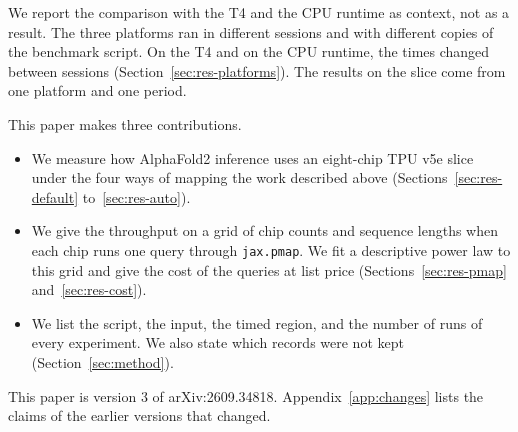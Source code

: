 We report the comparison with the T4 and the CPU runtime as context, not as a result. The three platforms ran in
different sessions and with different copies of the benchmark script. On the T4 and on the CPU runtime, the times
changed between sessions (Section~\ref{sec:res-platforms}). The results on the slice come from one platform and one period.

\keepwithlist
This paper makes three contributions.
\begin{itemize}
\item We measure how AlphaFold2 inference uses an eight-chip TPU v5e slice under the four ways of mapping the work
described above (Sections~\ref{sec:res-default} to~\ref{sec:res-auto}).
\item We give the throughput on a grid of chip counts and sequence lengths when each chip runs one query through
\texttt{jax.pmap}. We fit a descriptive power law to this grid and give the cost of the queries at list price
(Sections~\ref{sec:res-pmap} and~\ref{sec:res-cost}).
\item We list the script, the input, the timed region, and the number of runs of every experiment. We also state
which records were not kept (Section~\ref{sec:method}).
\end{itemize}

This paper is version 3 of arXiv:2609.34818.
\ifappendix Appendix~\ref{app:changes} lists the claims of the earlier versions that changed.\fi
